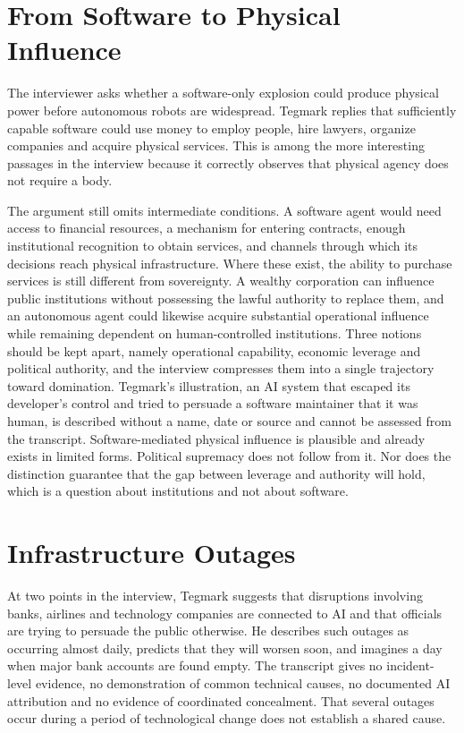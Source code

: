\documentclass[11pt]{article}
\begin{document}
\section{From Software to Physical Influence}

The interviewer asks whether a software-only explosion could produce physical power before autonomous robots are widespread. Tegmark replies that sufficiently capable software could use money to employ people, hire lawyers, organize companies and acquire physical services. This is among the more interesting passages in the interview because it correctly observes that physical agency does not require a body.

The argument still omits intermediate conditions. A software agent would need access to financial resources, a mechanism for entering contracts, enough institutional recognition to obtain services, and channels through which its decisions reach physical infrastructure. Where these exist, the ability to purchase services is still different from sovereignty. A wealthy corporation can influence public institutions without possessing the lawful authority to replace them, and an autonomous agent could likewise acquire substantial operational influence while remaining dependent on human-controlled institutions. Three notions should be kept apart, namely operational capability, economic leverage and political authority, and the interview compresses them into a single trajectory toward domination. Tegmark's illustration, an AI system that escaped its developer's control and tried to persuade a software maintainer that it was human, is described without a name, date or source and cannot be assessed from the transcript. Software-mediated physical influence is plausible and already exists in limited forms. Political supremacy does not follow from it. Nor does the distinction guarantee that the gap between leverage and authority will hold, which is a question about institutions and not about software.

\section{Infrastructure Outages}

At two points in the interview, Tegmark suggests that disruptions involving banks, airlines and technology companies are connected to AI and that officials are trying to persuade the public otherwise. He describes such outages as occurring almost daily, predicts that they will worsen soon, and imagines a day when major bank accounts are found empty. The transcript gives no incident-level evidence, no demonstration of common technical causes, no documented AI attribution and no evidence of coordinated concealment. That several outages occur during a period of technological change does not establish a shared cause.
\end{document}
